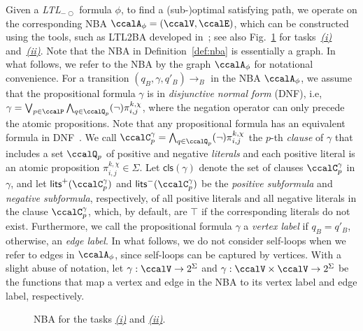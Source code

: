 \documentclass[Afour,sageh,times]{sagej}
\newcommand{\ltl}{ {\it LTL}$_{-\bigcirc}$ }
\newcommand{\autop}{\ccalA_{\phi}}
\renewcommand{\ap}[3]{\mathcal{\pi}_{{#1},{#2}}^{#3}}
\begin{document}
Given a \ltl formula $\phi$, to find a (sub-)optimal satisfying path, we operate on the corresponding NBA $\autop = (\ccalV, \ccalE)$, which can  be constructed using the tools, such as LTL2BA developed in~\cite{gastin2001fast}; see also Fig.~\ref{fig:nba_iii} for tasks~\hyperref[task:i]{\it (i)} and~\hyperref[task:ii]{\it (ii)}. Note that the NBA in Definition~\ref{def:nba} is essentially a graph. In what follows, we refer to the NBA by the graph $\autop$ for notational convenience. For a transition $(q_B, \gamma, q'_B)\to_B$ in the NBA $\autop$, we assume that the propositional formula $\gamma$ is  in {\it disjunctive normal form} (DNF), i.e,
$ \gamma = \bigvee_{p\in \ccalP} \bigwedge_{q\in \ccalQ_p} (\neg)\ap{i}{j}{k,\chi}$, where the negation operator can only precede the atomic propositions. Note that any propositional formula has an equivalent formula in DNF~\cite{baier2008principles}. We call  $\ccalC_p^{\gamma}=\bigwedge_{q\in \ccalQ_p}(\neg) \ap{i}{j}{k,\chi}$ the $p$-th {\it clause} of $\gamma$ that includes a set $\ccalQ_p$ of positive and negative {\it literals} and each positive literal is an atomic proposition $\ap{i}{j}{k,\chi}\in \Sigma$. Let $\mathsf{cls}(\gamma)$ denote the set of clauses $\ccalC_p^{\gamma}$ in $\gamma$, and let $\mathsf{lits}^+(\ccalC_p^{\gamma})$ and $\mathsf{lits}^-(\ccalC_p^{\gamma})$ be the {\it positive subformula} and {\it negative  subformula}, respectively,  of all positive literals and all negative literals in the clause $\ccalC_p^\gamma$, which, by default, are $\top$ if the corresponding literals do not exist. Furthermore, we call the propositional formula $\gamma$ a {\it vertex label} if $q_B=q'_B$, otherwise, an {\it edge label}. In what follows, we do not consider self-loops when we refer to edges in $\autop$, since self-loops can be captured by vertices.   With a slight abuse of notation, let {$\gamma: \ccalV \to  2^\Sigma $} and {$\gamma: \ccalV \times \ccalV \to 2^\Sigma$} be the functions that map a vertex and edge in the NBA to its vertex label and edge label, respectively.
 \begin{figure}[!t]
   \centering
   \caption{NBA for the tasks \hyperref[task:i]{\it (i)} and \hyperref[task:ii]{\it (ii)}.}
   \label{fig:nba_iii}
 \end{figure}
\end{document}
